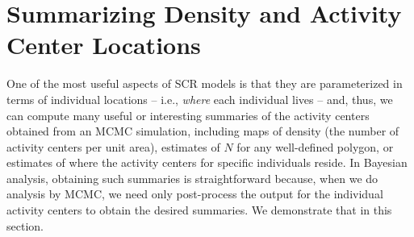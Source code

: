 \section{Summarizing Density and Activity Center Locations}

One of the most useful aspects of SCR models is that they are
parameterized in terms of individual locations -- i.e., {\it where}
each individual lives -- and, thus, we can compute many useful or
interesting summaries of the activity centers obtained from an MCMC
simulation, including maps of density (the number of activity centers
per unit area), estimates of $N$ for any well-defined polygon, or
estimates of where the activity centers for specific individuals
reside. In Bayesian analysis, obtaining such summaries is
straightforward because, when we do analysis by MCMC, we need only
post-process the output for the individual activity centers to obtain
the desired summaries. We demonstrate that in this section.

